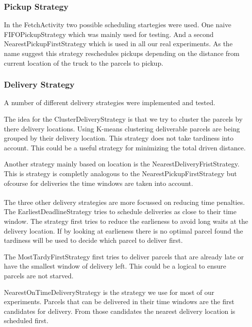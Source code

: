 \documentclass[../main.tex]{subfiles}
\begin{document}
\subsubsection{Pickup Strategy}
In the FetchActivity two possible scheduling startegies were used.
One naive FIFOPickupStrategy which was mainly used for testing.
And a second NearestPickupFirstStrategy which is used in all our real experiments.
As the name suggest this strategy reschedules pickups depending on the distance from current location of the truck to the parcels to pickup.

\subsubsection{Delivery Strategy}
A number of different delivery strategies were implemented and tested. 

The idea for the ClusterDeliveryStrategy is that we try to cluster the parcels by there delivery locations. 
Using K-means clustering deliverable parcels are being grouped by their delivery location.
This strategy does not take tardiness into account.
This could be a useful strategy for minimizing the total driven distance. 

Another strategy mainly based on location is the NearestDeliveryFristStrategy.
This is strategy is completly analogous to the NearestPickupFirstStrategy but ofcourse for deliveries the time windows are taken into account.
\\\\
The three other delivery strategies are more focussed on reducing time penalties.
The EarliestDeadlineStrategy tries to schedule deliveries as close to their time window.
The strategy first tries to reduce the earlieness to avoid long waits at the delivery location.
If by looking at earlieness there is no optimal parcel found the tardiness will be used to decide which parcel to deliver first. 

The MostTardyFirstStrategy first tries to deliver parcels that are already late or have the smallest window of delivery left. 
This could be a logical to ensure parcels are not starved.

NearestOnTimeDeliveryStrategy is the strategy we use for most of our experiments. 
Parcels that can be delivered in their time windows are the first candidates for delivery.
From those candidates the nearest delivery location is scheduled first.
\end{document}
